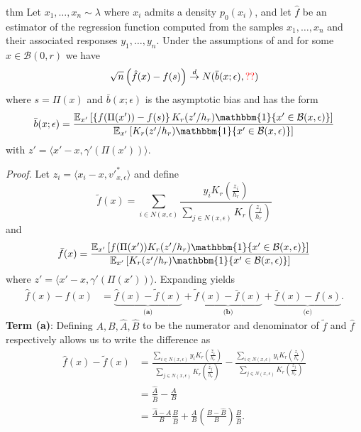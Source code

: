 \documentclass[11pt]{article}
\begin{document}
\begin{restatable}{thm}{} 
    Let $x_1, \dots, x_n \sim \lambda$ where $x_i$ admits a density $p_0(x_i)$, and let $\hat{f}$ be an estimator of the regression function computed from the samples $x_1, \dots, x_n$ and their associated responses $y_1, \dots, y_n$. Under the assumptions of  and for some $x\in \mathcal{B}(0, r)$ we have
    \[\sqrt{n}\left(\hat{f}(x) - f(s)\right) \overset{d}{\rightarrow} N(\bar{b}(x; \epsilon), \textcolor{red}{??}) \]
    where $s = \Pi(x)$ and $\bar{b}(x;\epsilon)$ is the asymptotic bias and has the form
    \begin{equation}
        \bar{b}(x; \epsilon) = \frac{\mathbb{E}_{x'}\left[\left\{f(\Pi(x')) - f(s)\right\}K_r(z'/h_r)\mathbbm{1}\{x'\in \mathcal{B}(x, \epsilon)\}\right]}{\mathbb{E}_{x'}\left[K_r(z'/h_r)\mathbbm{1}\{x'\in \mathcal{B}(x, \epsilon)\}\right]}
    \end{equation}
    with $z' = \langle x' - x, \gamma'(\Pi(x'))\rangle.$
\end{restatable}
\noindent \textit{Proof.} Let $z_i = \langle x_i - x, v'^*_{x, \epsilon}\rangle$ and define
\[\tilde{f}(x) = \sum_{i \in N(x, \epsilon)}\frac{y_iK_r(\frac{z_i}{h_r})}{\sum_{j \in N(x, \epsilon)}K_r(\frac{z_j}{h_r})}\]
and
\[\bar{f}(x) = \frac{\mathbb{E}_{x'}\left[f(\Pi(x'))K_r(z'/h_r)\mathbbm{1}\{x'\in \mathcal{B}(x, \epsilon)\}\right]}{\mathbb{E}_{x'}\left[K_r(z'/h_r)\mathbbm{1}\{x'\in \mathcal{B}(x, \epsilon)\}\right]}\]
where $z' = \langle x'-x,\gamma'(\Pi(x'))\rangle$. Expanding yields
\begin{align}
    \hat{f}(x) - f(x) &= \underbrace{\hat{f}(x) - \tilde{f}(x)}_{\textbf{(a)}} + 
    \underbrace{\tilde{f}(x) - \bar{f}(x)}_{\textbf{(b)}} + \underbrace{\bar{f}(x) - f(s)}_{\textbf{(c)}}.
\end{align}
\textbf{Term (a)}: Defining $A, B, \widehat{A}, \widehat{B}$ to be the numerator and denominator of $\tilde{f}$ and $\hat{f}$ respectively allows us to write the difference as
\begin{align}
    \hat{f}(x) - \tilde{f}(x) &= \frac{\sum_{i \in N(x, \epsilon)}y_iK_r(\frac{\hat{z}_i}{h_r})}{\sum_{j \in N(x, \epsilon)}K_r(\frac{\hat{z}_j}{h_r})} - \frac{\sum_{i \in N(x, \epsilon)}y_iK_r(\frac{z_i}{h_r})}{\sum_{j \in N(x, \epsilon)}K_r(\frac{z_j}{h_r})} \\
    &= \frac{\widehat{A}}{\widehat{B}} - \frac{A}{B} \\
    &= \frac{\widehat{A}-A}{B}\frac{B}{\widehat{B}} + \frac{A}{B}\left(\frac{B - \widehat{B}}{B}\right)\frac{B}{\widehat{B}}. \label{eq: kdr estimator decomp}
\end{align}
\end{document}
